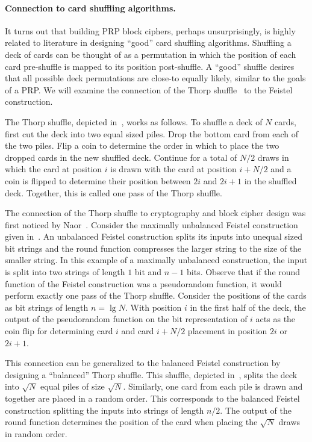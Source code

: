 \paragraph{Connection to card shuffling algorithms.}
It turns out that building PRP block ciphers, perhaps unsurprisingly, is highly related to literature in designing ``good'' card shuffling algorithms.
Shuffling a deck of cards can be thought of as a permutation in which the position of each card pre-shuffle is mapped to its position post-shuffle.
A ``good'' shuffle desires that all possible deck permutations are close-to equally likely, similar to the goals of a PRP.
We will examine the connection of the Thorp shuffle~\cite{Thorp73} to the Feistel construction.

The Thorp shuffle, depicted in~, works as follows.
To shuffle a deck of $N$ cards, first cut the deck into two equal sized piles.
Drop the bottom card from each of the two piles.
Flip a coin to determine the order in which to place the two dropped cards in the new shuffled deck.
Continue for a total of $N/2$ draws in which the card at position $i$ is drawn with the card at position $i+N/2$ and a coin is flipped to determine their position between $2i$ and $2i+1$ in the shuffled deck.
Together, this is called one pass of the Thorp shuffle.

The connection of the Thorp shuffle to cryptography and block cipher design was first noticed by Naor~\cite{NaorReingold99}.
Consider the maximally unbalanced Feistel construction given in~.
An unbalanced Feistel construction splits its inputs into unequal sized bit strings and the round function compresses the larger string to the size of the smaller string.
In this example of a maximally unbalanced construction, the input is split into two strings of length $1$ bit and $n-1$ bits.
Observe that if the round function of the Feistel construction was a pseudorandom function, it would perform exactly one pass of the Thorp shuffle.
Consider the positions of the cards as bit strings of length $n = \lg N$.
With position $i$ in the first half of the deck, the output of the pseudorandom function on the bit representation of $i$ acts as the coin flip for determining card $i$ and card $i + N/2$ placement in position $2i$ or $2i+1$.

This connection can be generalized to the balanced Feistel construction by designing a ``balanced'' Thorp shuffle.
This shuffle, depicted in~, splits the deck into $\sqrt{N}$ equal piles of size $\sqrt{N}$.
Similarly, one card from each pile is drawn and together are placed in a random order.
This corresponds to the balanced Feistel construction splitting the inputs into strings of length $n/2$.
The output of the round function determines the position of the card when placing the $\sqrt{N}$ draws in random order.

